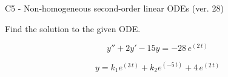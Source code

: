 \begin{exercise}
  \begin{exerciseTitle}C5 - Non-homogeneous second-order linear ODEs (ver. 28)\end{exerciseTitle}
  \begin{exerciseStatement}
    
Find the solution to the given ODE.

    
\[y''+2y'-15y = -28 \, e^{\left(2 \, t\right)}\]

  \end{exerciseStatement}
  \begin{exerciseAnswer}
    
\[y= k_{1} e^{\left(3 \, t\right)} + k_{2} e^{\left(-5 \, t\right)} + 4 \, e^{\left(2 \, t\right)}\]

  \end{exerciseAnswer}
\end{exercise}